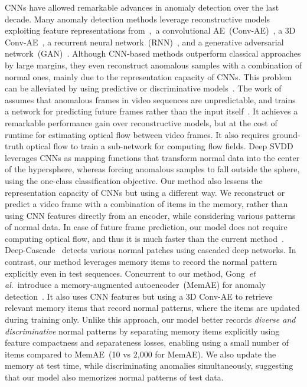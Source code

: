 \documentclass[10pt,twocolumn,letterpaper]{article}
\begin{document}
		CNNs have allowed remarkable advances in anomaly detection over the last decade. Many anomaly detection methods leverage reconstructive models~\cite{hasan2016learning,luo2017revisit,chong2017abnormal,ravanbakhsh2017abnormal} exploiting feature representations from~\eg,~a convolutional AE~(Conv-AE)~\cite{hasan2016learning}, a 3D Conv-AE~\cite{zhao2017spatio}, a recurrent neural network~(RNN)~\cite{medel2016anomaly,luo2017revisit,luo2017remembering}, and a generative adversarial network~(GAN)~\cite{ravanbakhsh2017abnormal}. Although CNN-based methods outperform classical approaches by large margins, they even reconstruct anomalous samples with a combination of normal ones, mainly due to the representation capacity of CNNs. This problem can be alleviated by using predictive or discriminative models~\cite{liu2018future,ruff2018deep}. The work of~\cite{liu2018future} assumes that anomalous frames in video sequences are unpredictable, and trains a network for predicting future frames rather than the input itself~\cite{liu2018future}. It achieves a remarkable performance gain over reconstructive models, but at the cost of runtime for estimating optical flow between video frames. It also requires ground-truth optical flow to train a sub-network for computing flow fields. Deep SVDD~\cite{ruff2018deep} leverages CNNs as mapping functions that transform normal data into the center of the hypersphere, whereas forcing anomalous samples to fall outside the sphere, using the one-class classification objective. Our method also lessens the representation capacity of CNNs but using a different way. We reconstruct or predict a video frame with a combination of items in the memory, rather than using CNN features directly from an encoder, while considering various patterns of normal data. In case of future frame prediction, our model does not require computing optical flow, and thus it is much faster than the current method~\cite{liu2018future}. Deep-Cascade~\cite{sabokrou2017deep} detects various normal patches using cascaded deep networks. In contrast, our method leverages memory items to record the normal pattern explicitly even in test sequences. Concurrent to our method, Gong~\emph{et al}.~introduce a memory-augmented autoencoder~(MemAE) for anomaly detection~\cite{gong2019memorizing}. It also uses CNN features but using a 3D Conv-AE to retrieve relevant memory items that record normal patterns, where the items are updated during training only. Unlike this approach, our model better records \emph{diverse and discriminative} normal patterns by separating memory items explicitly using feature compactness and separateness losses, enabling using a small number of items compared to MemAE~(10 vs 2,000 for MemAE). We also update the memory at test time, while discriminating anomalies simultaneously, suggesting that our model also memorizes normal patterns of test data.
\end{document}
